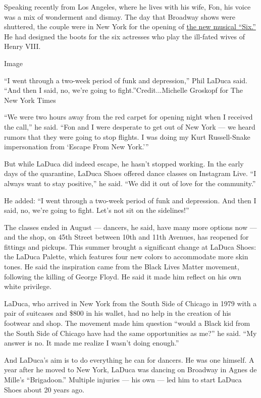 Speaking recently from Los Angeles, where he lives with his wife, Fon,
his voice was a mix of wonderment and dismay. The day that Broadway
shows were shuttered, the couple were in New York for the opening of
\href{https://www.nytimes3xbfgragh.onion/2020/02/27/theater/six-broadway.html}{the
new musical ``Six.''} He had designed the boots for the six actresses
who play the ill-fated wives of Henry VIII.

Image

``I went through a two-week period of funk and depression,'' Phil LaDuca
said. ``And then I said, no, we're going to fight.''Credit...Michelle
Groskopf for The New York Times

``We were two hours away from the red carpet for opening night when I
received the call,'' he said. ``Fon and I were desperate to get out of
New York --- we heard rumors that they were going to stop flights. I was
doing my Kurt Russell-Snake impersonation from `Escape From New York.'''

But while LaDuca did indeed escape, he hasn't stopped working. In the
early days of the quarantine, LaDuca Shoes offered dance classes on
Instagram Live. ``I always want to stay positive,'' he said. ``We did it
out of love for the community.''

He added: ``I went through a two-week period of funk and depression. And
then I said, no, we're going to fight. Let's not sit on the sidelines!''

The classes ended in August --- dancers, he said, have many more options
now --- and the shop, on 45th Street between 10th and 11th Avenues, has
reopened for fittings and pickups. This summer brought a significant
change at LaDuca Shoes: the LaDuca Palette, which features four new
colors to accommodate more skin tones. He said the inspiration came from
the Black Lives Matter movement, following the killing of George Floyd.
He said it made him reflect on his own white privilege.

LaDuca, who arrived in New York from the South Side of Chicago in 1979
with a pair of suitcases and \$800 in his wallet, had no help in the
creation of his footwear and shop. The movement made him question
``would a Black kid from the South Side of Chicago have had the same
opportunities as me?'' he said. ``My answer is no. It made me realize I
wasn't doing enough.''

And LaDuca's aim is to do everything he can for dancers. He was one
himself. A year after he moved to New York, LaDuca was dancing on
Broadway in Agnes de Mille's ``Brigadoon.'' Multiple injuries --- his
own --- led him to start LaDuca Shoes about 20 years ago.


